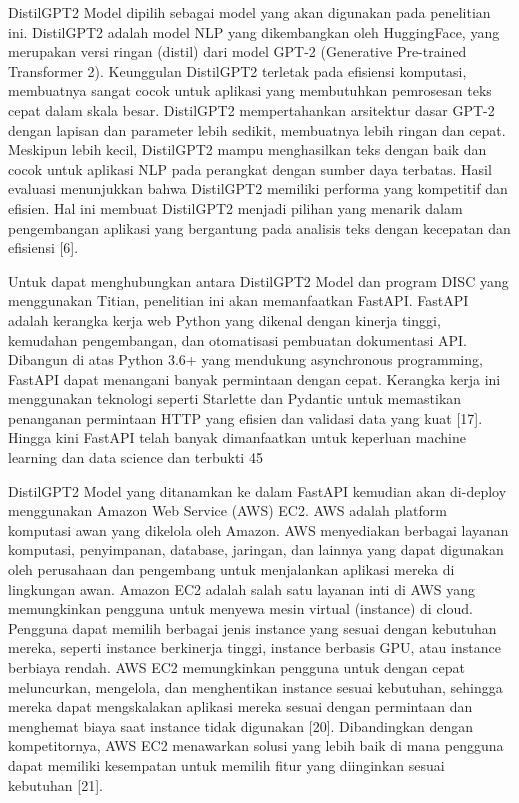 DistilGPT2 Model dipilih sebagai model yang akan digunakan pada penelitian ini. DistilGPT2 adalah model NLP yang dikembangkan oleh HuggingFace, yang merupakan versi ringan (distil) dari model GPT-2 (Generative Pre-trained Transformer 2). Keunggulan DistilGPT2 terletak pada efisiensi komputasi, membuatnya sangat cocok untuk aplikasi yang membutuhkan pemrosesan teks cepat dalam skala besar. DistilGPT2 mempertahankan arsitektur dasar GPT-2 dengan lapisan dan parameter lebih sedikit, membuatnya lebih ringan dan cepat. Meskipun lebih kecil, DistilGPT2 mampu menghasilkan teks dengan baik dan cocok untuk aplikasi NLP pada perangkat dengan sumber daya terbatas. Hasil evaluasi menunjukkan bahwa DistilGPT2 memiliki performa yang kompetitif dan efisien. Hal ini membuat DistilGPT2 menjadi pilihan yang menarik dalam pengembangan aplikasi yang bergantung pada analisis teks dengan kecepatan dan efisiensi [6].

Untuk dapat menghubungkan antara DistilGPT2 Model dan program DISC yang menggunakan Titian, penelitian ini akan memanfaatkan FastAPI. FastAPI adalah kerangka kerja web Python yang dikenal dengan kinerja tinggi, kemudahan pengembangan, dan otomatisasi pembuatan dokumentasi API. Dibangun di atas Python 3.6+ yang mendukung asynchronous programming, FastAPI dapat menangani banyak permintaan dengan cepat. Kerangka kerja ini menggunakan teknologi seperti Starlette dan Pydantic untuk memastikan penanganan permintaan HTTP yang efisien dan validasi data yang kuat [17]. Hingga kini FastAPI telah banyak dimanfaatkan untuk keperluan machine learning dan data science dan terbukti 45%

DistilGPT2 Model yang ditanamkan ke dalam FastAPI kemudian akan di-deploy menggunakan Amazon Web Service (AWS) EC2. AWS adalah platform komputasi awan yang dikelola oleh Amazon. AWS menyediakan berbagai layanan komputasi, penyimpanan, database, jaringan, dan lainnya yang dapat digunakan oleh perusahaan dan pengembang untuk menjalankan aplikasi mereka di lingkungan awan. Amazon EC2 adalah salah satu layanan inti di AWS yang memungkinkan pengguna untuk menyewa mesin virtual (instance) di cloud. Pengguna dapat memilih berbagai jenis instance yang sesuai dengan kebutuhan mereka, seperti instance berkinerja tinggi, instance berbasis GPU, atau instance berbiaya rendah. AWS EC2 memungkinkan pengguna untuk dengan cepat meluncurkan, mengelola, dan menghentikan instance sesuai kebutuhan, sehingga mereka dapat mengskalakan aplikasi mereka sesuai dengan permintaan dan menghemat biaya saat instance tidak digunakan [20]. Dibandingkan dengan kompetitornya, AWS EC2 menawarkan solusi yang lebih baik di mana pengguna dapat memiliki kesempatan untuk memilih fitur yang diinginkan sesuai kebutuhan [21]. 

